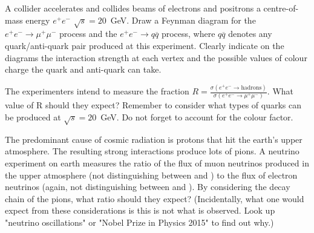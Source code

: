 
A collider accelerates and collides beams of electrons and positrons a centre-of-mass energy $e^+e^-$ $\sqrt{s}=20$~GeV. Draw a Feynman diagram for the
  $e^+e^-\to\mu^+\mu^-$ process and the $e^+e^-\to q\overline{q}$
  process, where $q\overline{q}$ denotes any quark/anti-quark pair
  produced at this experiment. Clearly indicate on the diagrams the
  interaction strength at each vertex and the possible values of colour charge the quark and anti-quark can take.
 
 The experimenters intend to measure the fraction $R=\frac{\sigma(e^+e^-\to\mathrm{hadrons})}{\sigma(e^+e^-\to
    \mu^+\mu^-)}$. What value of R should they expect? Remember to consider what types of quarks can be produced at  $\sqrt{s}=20$~GeV. Do not forget to account for the colour factor.

The predominant cause of cosmic radiation is protons that hit the earth's upper atmosphere. The resulting strong interactions produce lots of pions. A neutrino experiment on earth measures the ratio of the flux of muon neutrinos produced in the upper atmosphere (not distinguishing between \prt{\nu_{\mu}} and \prt{\overline{\nu}_{\mu}}) to the flux of
electron neutrinos (again, not distinguishing between  and ). By considering the decay chain of the pions, what ratio should they expect? 
(Incidentally, what one would expect from these considerations is this is not what is observed. Look up "neutrino oscillations" or "Nobel Prize in Physics 2015" to find out why.)

